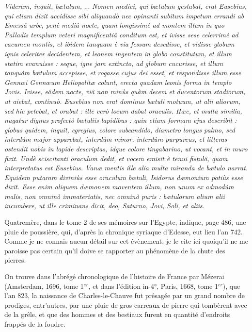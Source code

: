\documentclass[a4paper, 12pt, oneside, french]{article}
\begin{document}
\og \emph{Videram, inquit, bætulum,} ... \emph{Nomen medici, qui bœtulum gestabat, erat Eusebius, qui etiam dixit accidisse sibi aliquandò nec opinanti subitum impetum errandi ab Emessâ urbe, penè mediâ nocte, quam longissimè ad montem illum in quo Palladis templum veteri magnificentiâ conditum est, et ivisse sese celerrimè ad cacumen montis, et ibidem tanquam è via fessum desedisse, et vidisse globum ignis celeriter decidentem, et leonem ingentem in globo constitutum, et illum statim evanuisse : seque, igne jam extincto, ad globum cucurisse, et illum tanquàm bœtulum accepisse, et rogasse cujus dei esset, et respondisse illum esse Gennœi Gennœum Heliopolitæ colunt, erecta quadam leonis forma in templo Jovis. Ivisse, eâdem nocte, viâ non minùs quàm decem et ducentorum stadiorum, ut aiebat, continuò. Eusebius non erat dominus bætuli motuum, ut alii aliorum, sed hic petebat, et orabut : ille verò locum dabat oraculis. Hæc, et multa similia, nugatur dignus profectò bœtuliis lapidibus : quin etiam formam ejus describit : globus quidem, inquit, egregius, colore subcandido, diametro longus palmo, sed interdùm major apparebat, interdùm minor, interdùm purpureus, et litteras ostendit nobis in lapide descriptas, idque colore tingabarino, ut vocant, et in muro fixit. Undè sciscitanti oraculum dedit, et vocem emisit è tenui fistulâ, quam interpretatus est Eusebius. Vanæ mentis ille alia multa miranda de bætulo narrat. Equidem putaram diviniùs esse oraculum bœtuli, Isidorus dæmonium potiùs esse dixit. Esse enim aliquem dæmonem moventem illum, non unum ex admodùm malis, non omninò immateriatis, nec omninò puris : bætulorum alium alii incumbere, ut ille criminans dicit, deo, Saturno, Jovi, Soli, et aliis.} \fg

Quatremère, dans le tome 2 de ses mémoires sur l'Egypte, indique, page 486, une pluie de poussière, qui, d'après la chronique syriaque d'Edesse, eut lieu l'an 742. Comme je ne connais aucun détail sur cet évènement, je le cite ici quoiqu'il ne me paroisse pas certain qu'il doive se rapporter au phénomène de la chute des pierres.

On trouve dans l'abrégé chronologique de l'histoire de France par Mézerai (Amsterdam, 1696, tome 1$^{er}$, et dans l'édition in-4°, Paris, 1668, tome 1$^{er}$), que l'an 823, la naissance de Charles-le-Chauve fut présagée par un grand nombre de prodiges, entr'autres, par une pluie de gros carreaux de pierre qui tombèrent avec de la grêle, et que des hommes et des bestiaux furent en quantité d'endroits frappés de la foudre.
\end{document}

